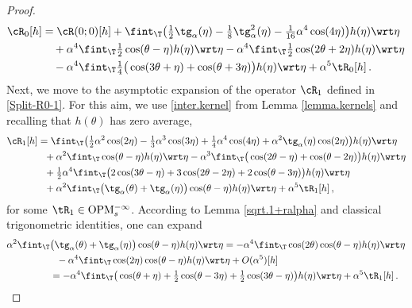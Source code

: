 \documentclass[a4paper,reqno,10pt]{article}
\newcommand{\OpM}{{\rm O}{\rm P}{\rm M}}
\begin{document}
\begin{proof}
\begin{align}
		\cR_{0} [h] & = \cR(0;0)[h] +	 \fint_{\T}\big( \tfrac12 \tg_{\alpha}(\eta)- \tfrac18 \tg_{\alpha}^2(\eta) -\tfrac{1}{16} \alpha^4 \cos(4\eta) \big) h(\eta) \wrt\eta 
		\\
		& \quad+{\alpha^4}\fint_{\T}\tfrac12 \cos(\theta-\eta)h(\eta) \wrt\eta  -{\alpha^4}\fint_{\T}\tfrac12 \cos(2\theta+2\eta) h(\eta) \wrt\eta \\
		&  \quad -{\alpha^4} \fint_{\T} \tfrac14\big( \cos(3\theta+\eta) +\cos(\theta+3\eta) \big)h(\eta) \wrt\eta + \alpha^5 \tR_{0}[h] \,.
 	\end{align}
Next, we move to the asymptotic expansion of the operator $\cR_{1}$ defined in \eqref{Split-R0-1}. For this aim, we use \eqref{inter.kernel} from Lemma \ref{lemma.kernels} and recalling that $h(\theta)$ has zero average,
	\begin{align}
		\cR_{1} [h]    
		&=  \fint_{\T} \big( \tfrac12 \alpha^2 \cos(2\eta) -\tfrac13 \alpha^3 \cos(3\eta) + \tfrac14 \alpha^4 \cos(4\eta) +\alpha^2 \tg_{\alpha}(\eta) \cos(2\eta)  \big) h(\eta) \wrt\eta \\
		&\ \  + {\alpha^2}\fint_{\T}\cos(\theta-\eta) h(\eta) \wrt \eta - {\alpha^3} \fint_{\T}\big( \cos(2\theta-\eta) + \cos(\theta-2\eta) \big)h(\eta) \wrt \eta    \\
		& \ \   + \tfrac{1}{2} \alpha^4 \fint_{\T} \big( 2\cos(3\theta-\eta) + 3\cos(2\theta-2\eta) +2\cos(\theta-3\eta) \big) h(\eta) \wrt\eta   \\
		& \ \ + {\alpha^2} \fint_{\T} \big( \tg_{\alpha}(\theta) + \tg_{\alpha}(\eta)\big) \cos(\theta-\eta) h(\eta) \wrt \eta + \alpha^5 \tR_{1}[h]\,,
	\end{align}
for some $\tR_{1}\in \OpM_{s}^{-\infty}$. According to Lemma \ref{sqrt.1+ralpha} and classical trigonometric identities, one can expand
	\begin{align}
		{\alpha^2} \fint_{\T}& \big( \tg_{\alpha}(\theta) + \tg_{\alpha}(\eta) \big)\cos(\theta-\eta) h(\eta) \wrt \eta  = -{\alpha^4} \fint_{\T} \cos(2\theta) \cos(\theta-\eta) h(\eta) \wrt \eta  \\
        &\ \ -{\alpha^4} \fint_{\T} \cos(2\eta) \cos(\theta-\eta) h(\eta) \wrt \eta + O(\alpha^5)[h] \\
		&=-{\alpha^4} \fint_{\T} \big( \cos(\theta+\eta) + \tfrac12 \cos(\theta-3\eta) +\tfrac12 \cos(3\theta-\eta)\big) h(\eta) \wrt \eta  + \alpha^5 \tR_{1}[h] \,.

\end{align}
\end{proof}
\end{document}

